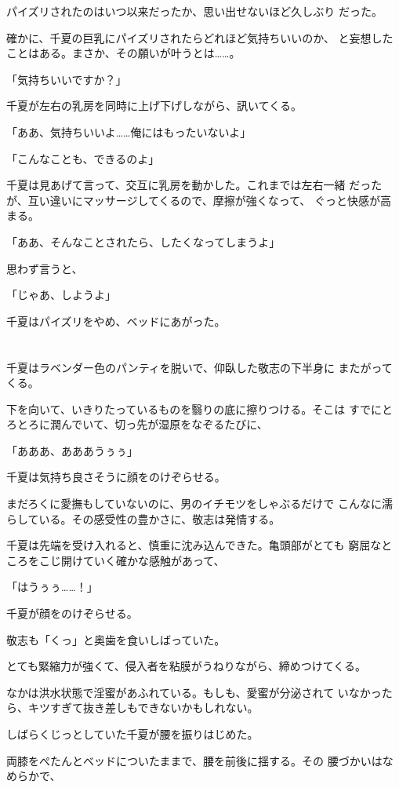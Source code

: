 ﻿\documentclass[
    book,tate,
    line_length=30zw,
    jafontsize=12pt,
    paper=b5j,
    landscape,
    ]{jlreq}
\begin{document}
パイズリされたのはいつ以来だったか、思い出せないほど久しぶり
だった。

確かに、千夏の巨乳にパイズリされたらどれほど気持ちいいのか、
と妄想したことはある。まさか、その願いが叶うとは……。

「気持ちいいですか？」

千夏が左右の乳房を同時に上げ下げしながら、訊いてくる。

「ああ、気持ちいいよ……俺にはもったいないよ」

「こんなことも、できるのよ」

千夏は見あげて言って、交互に乳房を動かした。これまでは左右一緒
だったが、互い違いにマッサージしてくるので、摩擦が強くなって、
ぐっと快感が高まる。

「ああ、そんなことされたら、したくなってしまうよ」

思わず言うと、

「じゃあ、しようよ」

千夏はパイズリをやめ、ベッドにあがった。

\section*{}

千夏はラベンダー色のパンティを脱いで、仰臥した敬志の下半身に
またがってくる。

下を向いて、いきりたっているものを翳りの底に擦りつける。そこは
すでにとろとろに潤んでいて、切っ先が湿原をなぞるたびに、

「あああ、あああうぅぅ」

千夏は気持ち良さそうに顔をのけぞらせる。

まだろくに愛撫もしていないのに、男のイチモツをしゃぶるだけで
こんなに濡らしている。その感受性の豊かさに、敬志は発情する。

千夏は先端を受け入れると、慎重に沈み込んできた。亀頭部がとても
窮屈なところをこじ開けていく確かな感触があって、

「はうぅぅ……！」

千夏が顔をのけぞらせる。

敬志も「くっ」と奥歯を食いしばっていた。

とても緊縮力が強くて、侵入者を粘膜がうねりながら、締めつけてくる。

なかは洪水状態で淫蜜があふれている。もしも、愛蜜が分泌されて
いなかったら、キツすぎて抜き差しもできないかもしれない。

しばらくじっとしていた千夏が腰を振りはじめた。

両膝をぺたんとベッドについたままで、腰を前後に揺する。その
腰づかいはなめらかで、
\end{document}
